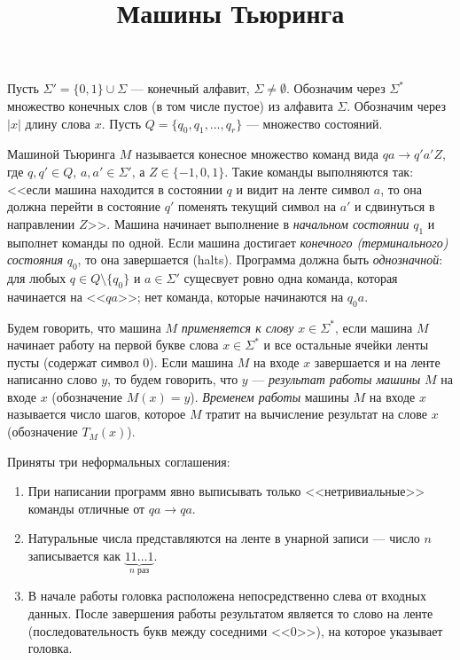 \documentclass[a4paper, 12pt, num=ТА1]{listok}
\begin{document}
\title{Машины Тьюринга}
\maketitle{}
Пусть $\Sigma' = \{0, 1\} \cup \Sigma$ --- конечный алфавит, $\Sigma \ne \emptyset$.
Обозначим через $\Sigma^{\ast}$ множество конечных слов (в том числе пустое) из алфавита $\Sigma$.
Обозначим через $|x|$ длину слова $x$.
Пусть $Q = \{q_0, q_1, \ldots, q_r\}$ --- множество состояний.
\begin{definition}
	Машиной Тьюринга $M$ называется конесное множество команд вида $q a \to q' a' Z$,
	где $q, q' \in Q$, $a, a' \in \Sigma'$, а $Z \in \{-1, 0, 1\}$.
	Такие команды выполняются так: <<если машина находится в состоянии $q$ и видит на ленте символ $a$,
	то она должна перейти в состояние $q'$ поменять текущий символ на $a'$ и сдвинуться в направлении $Z$>>.
	Машина начинает выполнение в \textit{начальном состоянии} $q_1$ и выполнет команды по одной.
	Если машина достигает \textit{конечного (терминального) состояния} $q_0$, то она завершается (halts).
	Программа должна быть \textit{однозначной}: для любых $q \in Q \setminus \{q_0\}$ и $a \in \Sigma'$
	сущесвует ровно одна команда, которая начинается на <<$q a$>>; нет команда, которые начинаются на $q_0 a$.
\end{definition}
\begin{definition}
	Будем говорить, что машина $M$ \textit{применяется к слову} $x \in \Sigma^\ast$,
	если машина $M$ начинает работу на первой букве слова $x \in \Sigma^\ast$ и все остальные ячейки ленты пусты
	(содержат символ 0).
	Если машина $M$ на входе $x$ завершается и на ленте написанно слово $y$, то будем говорить,
	что $y$ --- \textit{результат работы машины} $M$ на входе $x$ (обозначение $M(x) = y$).
	\textit{Временем работы} машины $M$ на входе $x$ называется число шагов, которое $M$ тратит на вычисление результат на слове $x$ (обозначение $T_M(x)$).
\end{definition}
\begin{note}
	Приняты три неформальных соглашения:
	\begin{enumerate}[label=\arabic*.]
		\item При написании программ явно выписывать только <<нетривиальные>> команды отличные от $qa \to qa$.
		\item Натуральные числа представляются на ленте в унарной записи --- число $n$ записывается как $\underbrace{11\ldots1}_{\text{$n$ раз}}$.
		\item В начале работы головка расположена непосредственно слева от входных данных.
			После завершения работы результатом является то слово на ленте (последовательность букв между соседними <<0>>), на которое указывает головка.
	\end{enumerate}
\end{note}
\end{document}
